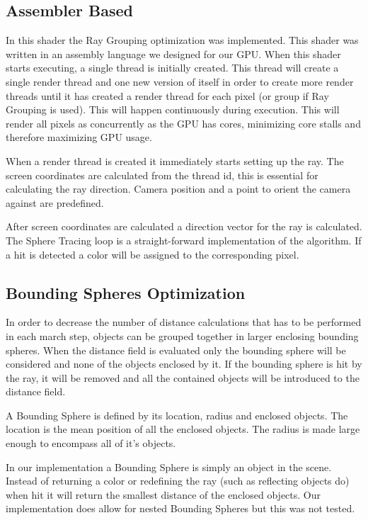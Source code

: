 		\subsection{Assembler Based}

			In this shader the Ray Grouping optimization was implemented. This shader
			was written in an assembly language we designed for our GPU. When this
			shader starts executing, a single thread is initially created. This
			thread will create a single render thread and one new version of itself
			in order to create more render threads until it has created a render
			thread for each pixel (or group if Ray Grouping is used). This will
			happen continuously during execution. This will render all pixels as
			concurrently as the GPU has cores, minimizing core stalls and therefore
			maximizing GPU usage.

			When a render thread is created it immediately starts setting up the ray.
			The screen coordinates are calculated from the thread id, this is
			essential for calculating the ray direction. Camera position and a point
			to orient the camera against are predefined. 

			After screen coordinates are calculated a direction vector for the ray is
			calculated. The Sphere Tracing loop is a straight-forward implementation
			of the algorithm. If a hit is detected a color will be assigned to the
			corresponding pixel.

		\subsection{Bounding Spheres Optimization}
			
			In order to decrease the number of distance calculations that has 
			to be performed in each march step, objects can be grouped together 
			in larger enclosing bounding spheres. When the distance field is 
			evaluated only the bounding sphere will be considered and none of 
			the objects enclosed by	it. If the bounding sphere is hit by the 
			ray, it will be removed and all	the contained objects will be 
			introduced to the distance field.
			
			A Bounding Sphere is defined by its location, radius and enclosed
			objects. The location is the mean position of all the enclosed objects.
			The radius is made large enough to encompass all of it's objects.

			In our implementation a Bounding Sphere is simply an object in the
			scene. Instead of returning a color or redefining the ray (such 
			as reflecting objects do) when hit it will return the smallest 
			distance of the enclosed objects. Our implementation does allow for
			nested Bounding Spheres but this was not tested.

